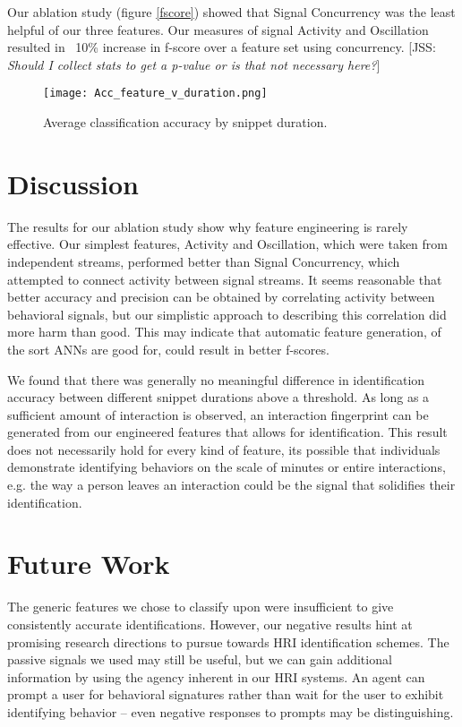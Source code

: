 \documentclass[conference]{IEEEtran}
\newcommand{\meta}[1]{{\textcolor[rgb]{0.1,0.7,0.2}{[JSS: {\it #1}]}}}
\begin{document}
Our ablation study (figure \ref{fscore}) showed that Signal Concurrency was the least helpful of our three features. Our measures of signal Activity and Oscillation resulted in ~10\% increase in f-score over a feature set using concurrency. \meta{Should I collect stats to get a p-value or is that not necessary here?}

\begin{figure}[h]
    \caption{Average classification accuracy by snippet duration.}
    \centering
    \texttt{[image: Acc\_feature\_v\_duration.png]}
    \label{acc_snippet}
\end{figure}

\section{Discussion}

The results for our ablation study show why feature engineering is rarely effective. Our simplest features, Activity and Oscillation, which were taken from independent streams, performed better than Signal Concurrency, which attempted to connect activity between signal streams. It seems reasonable that better accuracy and precision can be obtained by correlating activity between behavioral signals, but our simplistic approach to describing this correlation did more harm than good. This may indicate that automatic feature generation, of the sort ANNs are good for, could result in better f-scores.

We found that there was generally no meaningful difference in identification accuracy between different snippet durations above a threshold. As long as a sufficient amount of interaction is observed, an interaction fingerprint can be generated from our engineered features that allows for identification. This result does not necessarily hold for every kind of feature, its possible that individuals demonstrate identifying behaviors on the scale of minutes or entire interactions, e.g. the way a person leaves an interaction could be the signal that solidifies their identification. 

\section{Future Work}

The generic features we chose to classify upon were insufficient to give consistently accurate identifications. However, our negative results hint at promising research directions to pursue towards HRI identification schemes. The passive signals we used may still be useful, but we can gain additional information by using the agency inherent in our HRI systems. An agent can prompt a user for behavioral signatures rather than wait for the user to exhibit identifying behavior -- even negative responses to prompts may be distinguishing. 
\end{document}

